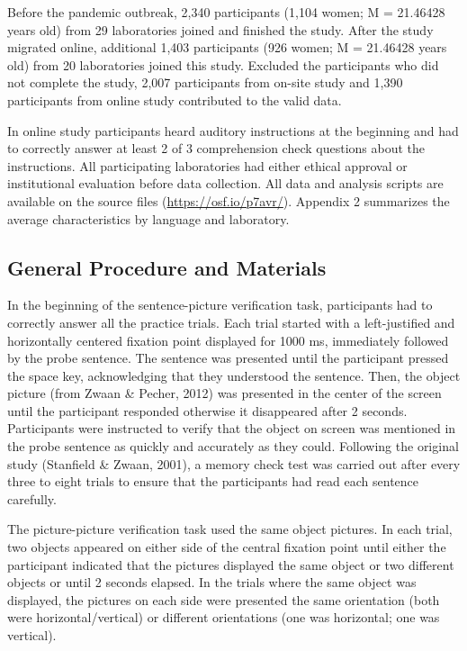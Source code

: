 \documentclass[
  man]{apa7}
\begin{document}
Before the pandemic outbreak, 2,340 participants (1,104 women; M = 21.46428 years old) from 29 laboratories joined and finished the study. After the study migrated online, additional 1,403 participants (926 women; M = 21.46428 years old) from 20 laboratories joined this study. Excluded the participants who did not complete the study, 2,007 participants from on-site study and 1,390 participants from online study contributed to the valid data.

In online study participants heard auditory instructions at the beginning and had to correctly answer at least 2 of 3 comprehension check questions about the instructions.
All participating laboratories had either ethical approval or institutional evaluation before data collection. All data and analysis scripts are available on the source files (\url{https://osf.io/p7avr/}). Appendix 2 summarizes the average characteristics by language and laboratory.

\hypertarget{general-procedure-and-materials}{%
\subsection{General Procedure and Materials}\label{general-procedure-and-materials}}

In the beginning of the sentence-picture verification task, participants had to correctly answer all the practice trials. Each trial started with a left-justified and horizontally centered fixation point displayed for 1000 ms, immediately followed by the probe sentence. The sentence was presented until the participant pressed the space key, acknowledging that they understood the sentence. Then, the object picture (from Zwaan \& Pecher, 2012) was presented in the center of the screen until the participant responded otherwise it disappeared after 2 seconds. Participants were instructed to verify that the object on screen was mentioned in the probe sentence as quickly and accurately as they could. Following the original study (Stanfield \& Zwaan, 2001), a memory check test was carried out after every three to eight trials to ensure that the participants had read each sentence carefully.

The picture-picture verification task used the same object pictures. In each trial, two objects appeared on either side of the central fixation point until either the participant indicated that the pictures displayed the same object or two different objects or until 2 seconds elapsed. In the trials where the same object was displayed, the pictures on each side were presented the same orientation (both were horizontal/vertical) or different orientations (one was horizontal; one was vertical).
\end{document}
